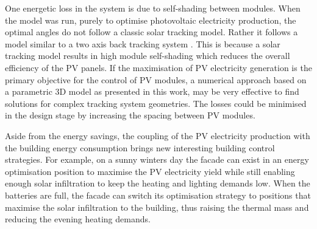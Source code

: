 
One energetic loss in the system is due to self-shading between modules. When the model was run, purely to optimise photovoltaic electricity production, the optimal angles do not follow a classic solar tracking model. Rather it follows a model similar to a two axis back tracking system \cite{lorenzo2011tracking}. This is because a solar tracking model results in high module self-shading which reduces the overall efficiency of the PV panels. If the maximisation of PV electricity generation is the primary objective for the control of PV modules, a numerical approach based on a parametric 3D model as presented in this work, may be very effective to find solutions for complex tracking system geometries. The losses could be minimised in the design stage by increasing the spacing between PV modules.

Aside from the energy savings, the coupling of the PV electricity production with the building energy consumption brings new interesting building control strategies. For example, on a sunny winters day the facade can exist in an energy optimisation position to maximise the PV electricity yield while still enabling enough solar infiltration to keep the heating and lighting demands low. When the batteries are full, the facade can switch its optimisation strategy to positions that maximise the solar infiltration to the building, thus raising the thermal mass and reducing the evening heating demands. 






